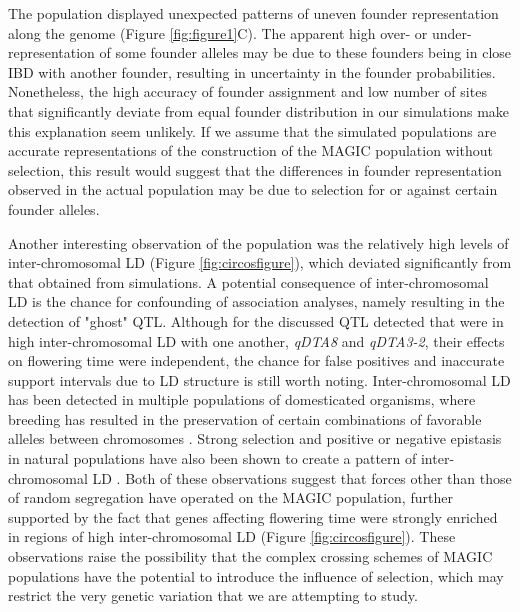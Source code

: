 \documentclass[9pt,twocolumn,twoside]{gsag3jnl}
\begin{document}
The population displayed unexpected patterns of uneven founder representation along the genome (Figure \ref{fig:figure1}C).
The apparent high over- or under-representation of some founder alleles may be due to these founders being in close IBD with another founder, resulting in uncertainty in the founder probabilities.
Nonetheless, the high accuracy of founder assignment and low number of sites that significantly deviate from equal founder distribution in our simulations make this explanation seem unlikely.
If we assume that the simulated populations are accurate representations of the construction of the MAGIC population without selection, this result would suggest that the differences in founder representation observed in the actual population may be due to selection for or against certain founder alleles.

Another interesting observation of the population was the relatively high levels of inter-chromosomal LD (Figure \ref{fig:circosfigure}), which deviated significantly from that obtained from simulations.
A potential consequence of inter-chromosomal LD is the chance for confounding of association analyses, namely resulting in the detection of "ghost" QTL.
Although for the discussed QTL detected that were in high inter-chromosomal LD with one another, \emph{qDTA8} and \emph{qDTA3-2}, their effects on flowering time were independent, the chance for false positives and inaccurate support intervals due to LD structure is still worth noting.
Inter-chromosomal LD has been detected in multiple populations of domesticated organisms, where breeding has resulted in the preservation of certain combinations of favorable alleles between chromosomes \citep{Robbins,MalyshevaOtto}.
Strong selection and positive or negative epistasis in natural populations have also been shown to create a pattern of inter-chromosomal LD \citep{Kulminski,Gupta,Hench,Petkov}.
Both of these observations suggest that forces other than those of random segregation have operated on the MAGIC population, further supported by the fact that genes affecting flowering time were strongly enriched in regions of high inter-chromosomal LD (Figure \ref{fig:circosfigure}).
These observations raise the possibility that the complex crossing schemes of MAGIC populations have the potential to introduce the influence of selection, which may restrict the very genetic variation that we are attempting to study.
\end{document}
